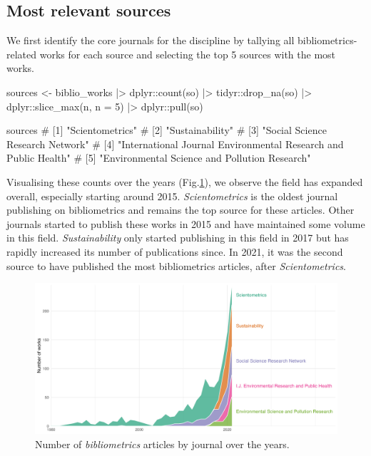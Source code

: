 \subsection{Most relevant sources }

We first identify the core journals for the discipline by tallying all bibliometrics-related works for each source and selecting the top 5 sources with the most works.


\begin{example}
sources <- biblio_works |>
  dplyr::count(so) |>
  tidyr::drop_na(so) |>
  dplyr::slice_max(n, n = 5) |>
  dplyr::pull(so)
  
sources
# [1] "Scientometrics"                                       
# [2] "Sustainability"  
# [3] "Social Science Research Network"                      
# [4] "International Journal Environmental Research and Public Health"                                        
# [5] "Environmental Science and Pollution Research"                                            
                           
\end{example}

Visualising these counts over the years (Fig.\ref{biblio_journals}), we observe the field has expanded overall, especially starting around 2015.
\emph{Scientometrics} is the oldest journal publishing on bibliometrics and remains the top source for these articles.
Other journals started to publish these works in 2015 and have maintained some volume in this field.
\emph{Sustainability} only started publishing in this field in 2017 but has rapidly increased its number of publications since.
In 2021, it was the second source to have published the most bibliometrics articles, after \emph{Scientometrics}.

\begin{figure}[htbp]
  \centering
  \includegraphics[scale=0.6]{figures/biblio-journals}
  \caption{Number of \emph{bibliometrics} articles by journal over the years.}
  \label{biblio_journals}
\end{figure}




